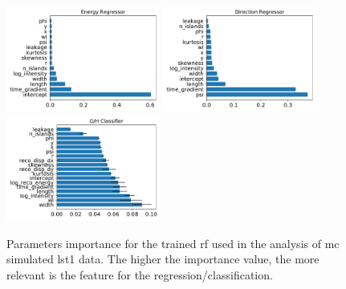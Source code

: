 \documentclass[main.tex]{subfiles}
\begin{document}
\begin{figure}[h]
  \centering
  \includegraphics[width=0.45\textwidth]{Pictures/reg_energy_importances.pdf}
  \includegraphics[width=0.45\textwidth]{Pictures/reg_disp_vector_importances.pdf}
  \includegraphics[width=0.45\textwidth]{Pictures/gls_importances.pdf}
  \caption{Parameters importance for the trained \gls{rf} used in the analysis of \gls{mc} simulated \gls{lst}1 data. The higher the importance value, the more relevant is the feature for the regression/classification.}
  \label{fig:importances}
\end{figure}
\end{document}
